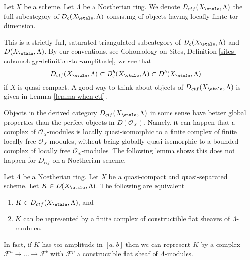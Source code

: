 \begin{definition}
\label{definition-ctf}
Let $X$ be a scheme. Let $\Lambda$ be a Noetherian ring. We denote
{\it $D_{ctf}(X_\etale, \Lambda)$} the full subcategory of
$D_c(X_\etale, \Lambda)$
consisting of objects having locally finite tor dimension.
\end{definition}

\noindent
This is a strictly full, saturated triangulated subcategory of
$D_c(X_\etale, \Lambda)$ and $D(X_\etale, \Lambda)$. By our conventions, see
Cohomology on Sites, Definition \ref{sites-cohomology-definition-tor-amplitude},
we see that
$$
D_{ctf}(X_\etale, \Lambda) \subset D^b_c(X_\etale, \Lambda)
\subset D^b(X_\etale, \Lambda)
$$
if $X$ is quasi-compact. A good way to think about objects of
$D_{ctf}(X_\etale, \Lambda)$ is given in Lemma \ref{lemma-when-ctf}.

\begin{remark}
\label{remark-different}
Objects in the derived category $D_{ctf}(X_\etale, \Lambda)$ in some sense have
better global properties than the perfect objects in  $D(\mathcal{O}_X)$.
Namely, it can happen that a complex of $\mathcal{O}_X$-modules
is locally quasi-isomorphic to a finite complex of finite locally free
$\mathcal{O}_X$-modules, without being
globally quasi-isomorphic to a bounded complex of locally free
$\mathcal{O}_X$-modules. The following lemma shows this does not
happen for $D_{ctf}$ on a Noetherian scheme.
\end{remark}

\begin{lemma}
\label{lemma-when-ctf}
Let $\Lambda$ be a Noetherian ring. Let $X$ be a quasi-compact
and quasi-separated scheme. Let $K \in D(X_\etale, \Lambda)$. The following
are equivalent
\begin{enumerate}
\item $K \in D_{ctf}(X_\etale, \Lambda)$, and
\item $K$ can be represented by a finite complex of constructible
flat sheaves of $\Lambda$-modules.
\end{enumerate}
In fact, if $K$ has tor amplitude in $[a, b]$ then we can represent
$K$ by a complex $\mathcal{F}^a \to \ldots \to \mathcal{F}^b$ with
$\mathcal{F}^p$ a constructible flat sheaf of $\Lambda$-modules.
\end{lemma}

